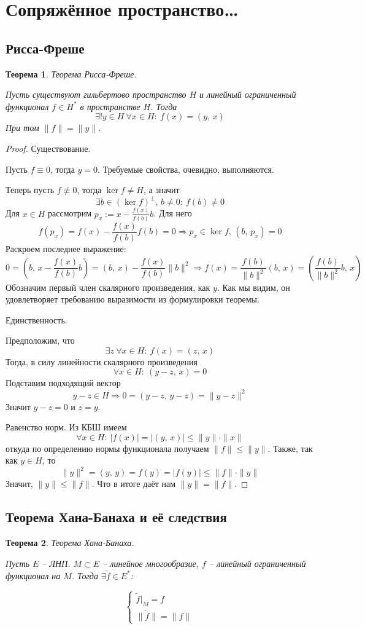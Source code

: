 \documentclass[a4paper,12pt]{article}
\renewcommand{\leq}{\ensuremath{\leqslant}}
\theoremstyle{plain}
\newtheorem{theorem}{Теорема}[section]
\theoremstyle{definition}
\theoremstyle{remark}
\begin{document}
\section{Сопряжённое пространство\dots}
\subsection{Рисса-Фреше}
\begin{theorem}
	Теорема Рисса-Фреше.

	Пусть существуют гильбертово пространство $H$ и линейный ограниченный функционал $f \in H^*$ в пространстве $H$. Тогда
	\[
		\exists! y \in H \: \forall x \in H :\: f(x) = (y,\,x)
	\]
	При том $\|f\| = \|y\|$.
\end{theorem}

\begin{proof}
	Существование.

	Пусть $f \equiv 0$, тогда $y = 0$. Требуемые свойства, очевидно, выполняются.

	Теперь пусть $f \not\equiv 0$, тогда $\ker f \neq H$, а значит
	\[
		\exists b \in (\ker f)^\bot,\, b \neq 0 :\: f(b) \neq 0
	\]
	Для $x \in H$ рассмотрим $p_x := x - \frac{f(x)}{f(b)}b$. Для него
	\[
		f(p_x) = f(x) - \frac{f(x)}{f(b)}f(b) = 0 \Rightarrow p_x \in \ker f,\, (b,\, p_x) = 0
	\]
	Раскроем последнее выражение:
	\[
		0 = \left(b,\, x - \frac{f(x)}{f(b)}b\right) = (b,\, x) - \frac{f(x)}{f(b)}\|b\|^2 \Rightarrow f(x) = \frac{f(b)}{\|b\|^2}(b,\, x) = \left(\frac{f(b)}{\|b\|^2}b,\, x\right)
	\]
	Обозначим первый член скалярного произведения, как $y$. Как мы видим, он удовлетворяет требованию выразимости из формулировки теоремы.

	Единственность.

	Предположим, что
	\[
		\exists z \: \forall x \in H :\: f(x) = (z,\,x)
	\]
	Тогда, в силу линейности скалярного произведения
	\[
		\forall x \in H :\: (y - z,\, x) = 0
	\]
	Подставим подходящий вектор
	\[
		y - z \in H \Rightarrow 0 = (y - z,\, y -z) = \|y - z\|^2
	\]
	Значит $y - z = 0$ и $z = y$.

	Равенство норм. Из КБШ имеем
	\[
		\forall x \in H :\: \vert f(x)\vert = \vert(y,\, x)\vert \leq \|y\|\cdot\|x\|
	\]
	откуда по определению нормы функционала получаем $\|f\| \leq \|y\|$. Также, так как $y \in H$, то
	\[
		\|y\|^2 = (y,\, y) = f(y) = \vert f(y)\vert \leq \|f\|\cdot\|y\|
	\]
	Значит, $\|y\| \leq \|f\|$. Что в итоге даёт нам $\|y\| = \|f\|$.
\end{proof}

\subsection{Теорема Хана-Банаха и её следствия}
\begin{theorem}
	Теорема Хана-Банаха.

	Пусть $E$ -- ЛНП. $M \subset E$ -- линейное многообразие, $f$ -- линейный ограниченный функционал на $M$. Тогда $\exists \tilde{f} \in E^*$:

	\[
		\begin{cases}
			\tilde{f}|_M = f \\
			\|\tilde{f}\| = \|f\|
		\end{cases}
	\]
\end{theorem}
\end{document}
